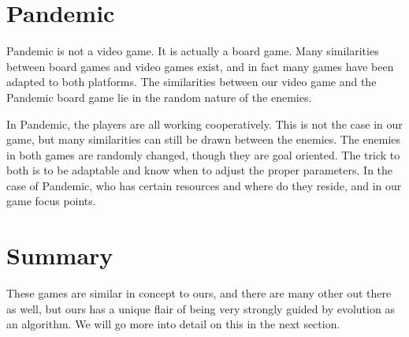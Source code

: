 \section{Pandemic}
Pandemic is not a video game. It is actually a board game. Many similarities between board games and video games exist, and in fact many games have been adapted to both platforms. The similarities between our video game and the Pandemic board game lie in the random nature of the enemies.

In Pandemic, the players are all working cooperatively. This is not the case in our game, but many similarities can still be drawn between the enemies. The enemies in both games are randomly changed, though they are goal oriented. The trick to both is to be adaptable and know when to adjust the proper parameters. In the case of Pandemic, who has certain resources and where do they reside, and in our game focus points.


\section{Summary}
These games are similar in concept to ours, and there are many other out there as well, but ours has a unique flair of being very strongly guided by evolution as an algorithm. We will go more into detail on this in the next section.

